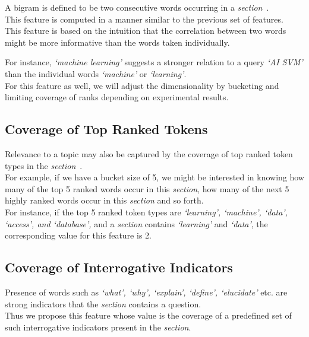 \documentclass[a4paper,10pt]{report}
\begin{document}
A bigram is defined to be two consecutive words occurring in a \emph{section}~\cite{squint}.\\

\noindent This feature is computed in a manner similar to the previous set of features. \\

\noindent This feature is based on the intuition that the correlation between two words might be more informative than the words taken individually. 

For instance, \emph{`machine learning'} suggests a stronger relation to a query \emph{`AI SVM'} than the
individual words \emph{`machine'} or \emph{`learning'}. \\

\noindent For this feature as well, we will adjust the dimensionality by bucketing and limiting coverage of ranks depending on experimental results.
\clearpage
\subsection {Coverage of Top Ranked Tokens}

Relevance to a topic may also be captured by the coverage of top ranked token types in the \emph{section}~\cite{squint}.\\

\noindent For example, if we have a bucket size of 5, we might be interested in knowing how many of the top 5 ranked words occur in this \emph{section}, how many of the next 5 highly ranked words occur in this \emph{section} and so forth. \\

\noindent For instance, if the top 5 ranked token types are \emph{`learning', `machine', `data', `access', and `database',} and a \emph{section} contains \emph{`learning'} and \emph{`data'}, the corresponding value for this feature is 2.

\subsection {Coverage of Interrogative Indicators}

Presence of words such as \emph{`what', `why', `explain', `define', `elucidate'} etc. are strong indicators that the \emph{section} contains a question. \\

\noindent Thus we propose this feature whose value is the coverage of a predefined set of such interrogative indicators present in the \emph{section}.\\
\end{document}
